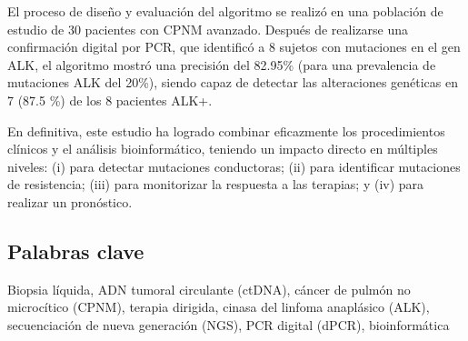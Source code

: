 El proceso de diseño y evaluación del algoritmo se realizó en una población de estudio de 30 pacientes con CPNM avanzado. Después de realizarse una confirmación digital por PCR, que identificó a 8 sujetos con mutaciones en el gen ALK, el algoritmo mostró una precisión del 82.95\% (para una prevalencia de mutaciones ALK del 20\%), siendo capaz de detectar las alteraciones genéticas en 7 (87.5 \%) de los 8 pacientes ALK+.

En definitiva, este estudio ha logrado combinar eficazmente los procedimientos clínicos y el análisis bioinformático, teniendo un impacto directo en múltiples niveles: (i) para detectar mutaciones conductoras; (ii) para identificar mutaciones de resistencia; (iii) para monitorizar la respuesta a las terapias; y (iv) para realizar un pronóstico.

\subsection*{Palabras clave}

Biopsia líquida, ADN tumoral circulante (ctDNA), cáncer de pulmón no microcítico (CPNM), terapia dirigida, cinasa del linfoma anaplásico (ALK), secuenciación de nueva generación (NGS), PCR digital (dPCR), bioinformática